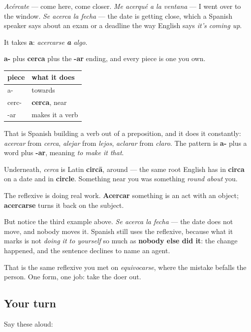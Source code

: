 \emph{Acércate} — come here, come closer. \emph{Me acerqué a la ventana} — I went over to the window. \emph{Se acerca la fecha} — the date is getting close, which a Spanish speaker says about an exam or a deadline the way English says \emph{it's coming up}.

It takes \textbf{a}: \emph{acercarse \textbf{a} algo}.

\begin{cousinweb}
\textbf{a-} plus \textbf{cerca} plus the \textbf{-ar} ending, and every piece is one you own.

\noindent
\begin{tabularx}{\linewidth}{@{}>{\raggedright\arraybackslash}X>{\raggedright\arraybackslash}X@{}}
\toprule
\textbf{piece} & \textbf{what it does} \\
\midrule
a- & towards \\
cerc- & \textbf{cerca}, near \\
-ar & makes it a verb \\
\bottomrule
\end{tabularx}

That is Spanish building a verb out of a preposition, and it does it constantly: \emph{acercar} from \emph{cerca}, \emph{alejar} from \emph{lejos}, \emph{aclarar} from \emph{claro}. The pattern is \textbf{a-} plus a word plus \textbf{-ar}, meaning \emph{to make it that}.

Underneath, \emph{cerca} is Latin \textbf{circā}, around — the same root English has in \textbf{circa} on a date and in \textbf{circle}. Something near you was something \emph{round about} you.
\end{cousinweb}

\begin{culture}
The reflexive is doing real work. \textbf{Acercar} something is an act with an object; \textbf{acercarse} turns it back on the subject.

But notice the third example above. \emph{Se acerca la fecha} — the date does not move, and nobody moves it. Spanish still uses the reflexive, because what it marks is not \emph{doing it to yourself} so much as \textbf{nobody else did it}: the change happened, and the sentence declines to name an agent.

That is the same reflexive you met on \emph{equivocarse}, where the mistake befalls the person. One form, one job: take the doer out.
\end{culture}

\subsection*{Your turn}
Say these aloud:

